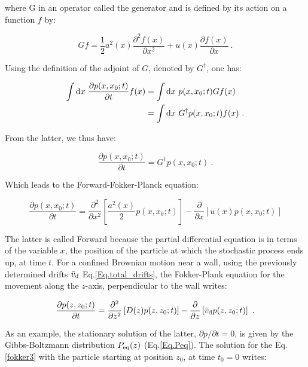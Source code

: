 where G in an operator called the generator and is defined by its action on a function $f$ by:

\begin{equation}
	Gf = \frac{1}{2} a^2 (x) \frac{\partial ^2 f(x)}{\partial x^2} + u(x) \frac{\partial f(x)}{\partial x} ~.
\end{equation}

Using the definition of the adjoint of $G$, denoted by $G ^\dagger$, one has:


\begin{equation}
	\begin{aligned}
		\int \textnormal{d} x ~\frac{\partial p(x, x_0 ; t) }{\partial t} f(x) &= \int \textnormal{d}x ~ p(x, x_0 ; t) G f(x) \\
		&= \int \textnormal{d}x ~  G ^\dagger p(x, x_0 ; t) f(x) ~.
	\end{aligned}
\end{equation}

From the latter, we thus have:

\begin{equation}
	\frac{\partial p(x, x_0 ; t)}{\partial t} = G^\dagger p(x, x_0 ; t) ~.
	\label{fokker3}
\end{equation}

Which leads to the Forward-Fokker-Planck equation:

\begin{equation}
	\frac{\partial p(x, x_0 ; t)}{\partial t }= \frac{\partial ^2}{\partial x^2} \left[\frac{a^2 (x)}{2}p(x, x_0 ; t)\right] - \frac{\partial}{\partial x} \left[u(x) p(x, x_0 ; t)\right]
	\label{Eq.Forward_Fokker_plank}
\end{equation}

The latter is called Forward because the partial differential equation is in terms of the variable $x$, the position of the particle at which the stochastic process ends up, at time $t$. For a confined Brownian motion near a wall, using the previously determined drifts $\bar{v}_\textnormal{d}$ Eq.\ref{Eq.total_drifts}, the Fokker-Plank equation for the movement along the $z$-axis, perpendicular to the wall writes:

\begin{equation}
	\frac{\partial p(z, z_0 ; t)}{\partial t} = \frac{\partial ^2}{\partial z ^2} \left[ D(z)  p(z, z_0 ; t) \right]   -  \frac{\partial }{\partial z} \left[\bar{v}_\textnormal{d} p(z, z_0 ; t)\right] ~.
\end{equation}

As an example, the stationary solution of the latter, $\partial p / \partial t = 0$, is given by the Gibbs-Boltzmann distribution $P_\textnormal{eq}(z) $ (Eq.\ref{Eq.Peq}). The solution for the Eq.\ref{fokker3} with the particle starting at position $z_0$, at time $t_0 = 0$ writes:

